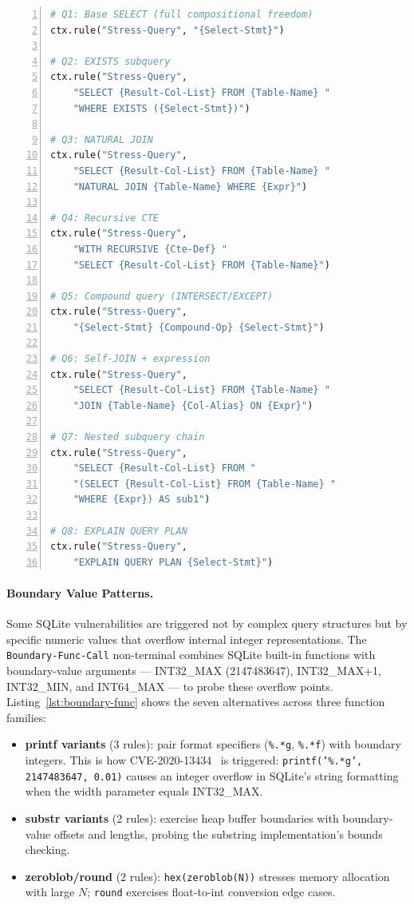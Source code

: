 \begin{lstlisting}[language=Python, caption={Stress-Query alternatives (Layer 2).}, label=lst:stress-query, basicstyle=\ttfamily\small, numbers=left]
# Q1: Base SELECT (full compositional freedom)
ctx.rule("Stress-Query", "{Select-Stmt}")

# Q2: EXISTS subquery
ctx.rule("Stress-Query",
    "SELECT {Result-Col-List} FROM {Table-Name} "
    "WHERE EXISTS ({Select-Stmt})")

# Q3: NATURAL JOIN
ctx.rule("Stress-Query",
    "SELECT {Result-Col-List} FROM {Table-Name} "
    "NATURAL JOIN {Table-Name} WHERE {Expr}")

# Q4: Recursive CTE
ctx.rule("Stress-Query",
    "WITH RECURSIVE {Cte-Def} "
    "SELECT {Result-Col-List} FROM {Table-Name}")

# Q5: Compound query (INTERSECT/EXCEPT)
ctx.rule("Stress-Query",
    "{Select-Stmt} {Compound-Op} {Select-Stmt}")

# Q6: Self-JOIN + expression
ctx.rule("Stress-Query",
    "SELECT {Result-Col-List} FROM {Table-Name} "
    "JOIN {Table-Name} {Col-Alias} ON {Expr}")

# Q7: Nested subquery chain
ctx.rule("Stress-Query",
    "SELECT {Result-Col-List} FROM "
    "(SELECT {Result-Col-List} FROM {Table-Name} "
    "WHERE {Expr}) AS sub1")

# Q8: EXPLAIN QUERY PLAN
ctx.rule("Stress-Query",
    "EXPLAIN QUERY PLAN {Select-Stmt}")
\end{lstlisting}

\paragraph{Boundary Value Patterns.}
Some SQLite vulnerabilities are triggered not by complex query structures but by specific numeric values that overflow internal integer representations. The \texttt{Boundary-Func-Call} non-terminal combines SQLite built-in functions with boundary-value arguments --- INT32\_MAX (2147483647), INT32\_MAX+1, INT32\_MIN, and INT64\_MAX --- to probe these overflow points. Listing~\ref{lst:boundary-func} shows the seven alternatives across three function families:

\begin{itemize}
    \item \textbf{printf variants} (3 rules): pair format specifiers (\texttt{\%.*g}, \texttt{\%.*f}) with boundary integers. This is how CVE-2020-13434~\citep{cve202013434} is triggered: \texttt{printf('\%.*g', 2147483647, 0.01)} causes an integer overflow in SQLite's string formatting when the width parameter equals INT32\_MAX.
    \item \textbf{substr variants} (2 rules): exercise heap buffer boundaries with boundary-value offsets and lengths, probing the substring implementation's bounds checking.
    \item \textbf{zeroblob/round} (2 rules): \texttt{hex(zeroblob(N))} stresses memory allocation with large $N$; \texttt{round} exercises float-to-int conversion edge cases.
\end{itemize}

